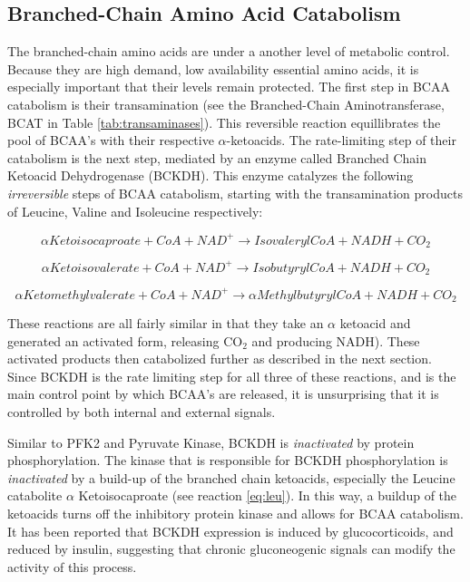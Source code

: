 \documentclass{tufte-handout}
\begin{document}
\subsection{Branched-Chain Amino Acid Catabolism}

The branched-chain amino acids are under a another level of metabolic control.  Because they are high demand, low availability essential amino acids, it is especially important that their levels remain protected.  The first step in BCAA catabolism is their transamination (see the Branched-Chain Aminotransferase, BCAT in Table \ref{tab:transaminases}).  This reversible reaction equillibrates the pool of BCAA's with their respective $\alpha$-ketoacids.  The rate-limiting step of their catabolism is the next step, mediated by an enzyme called Branched Chain Ketoacid Dehydrogenase (BCKDH).  This enzyme catalyzes the following \emph{irreversible} steps of BCAA catabolism, starting with the transamination products of Leucine, Valine and Isoleucine respectively:

\begin{equation}\label{eq:leu}
\alpha Ketoisocaproate + CoA + NAD^+ \rightarrow IsovalerylCoA + NADH + CO_2
\end{equation}

\begin{equation}\label{eq:val}
\alpha Ketoisovalerate + CoA + NAD^+ \rightarrow IsobutyrylCoA + NADH + CO_2
\end{equation}

\begin{equation}\label{eq:iso}
\alpha Ketomethylvalerate + CoA + NAD^+ \rightarrow \alpha MethylbutyrylCoA + NADH + CO_2
\end{equation}

These reactions are all fairly similar in that they take an $\alpha$ ketoacid and generated an activated form, releasing CO$_2$ and producing NADH).  These activated products then catabolized further as described in the next section.  Since BCKDH is the rate limiting step for all three of these reactions, and is the main control point by which BCAA's are released, it is unsurprising that it is controlled by both internal and external signals.

  Similar to PFK2 and Pyruvate Kinase, BCKDH is \emph{inactivated} by protein phosphorylation.  The kinase that is responsible for BCKDH phosphorylation is \emph{inactivated} by a build-up of the branched chain ketoacids, especially the Leucine catabolite $\alpha$ Ketoisocaproate (see reaction \ref{eq:leu}).  In this way, a buildup of the ketoacids turns off the inhibitory protein kinase and allows for BCAA catabolism.  It has been reported that BCKDH expression is induced by glucocorticoids, and reduced by insulin, suggesting that chronic gluconeogenic signals can modify the activity of this process. 
\end{document}
